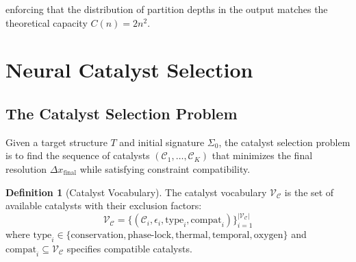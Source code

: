 \documentclass[11pt,a4paper]{article}
\theoremstyle{definition}
\newtheorem{definition}[theorem]{Definition}
\theoremstyle{remark}
\newcommand{\Sig}{\Sigma}
\newcommand{\catalyst}{\mathcal{C}}
\newcommand{\vocab}{\mathcal{V}}
\begin{document}
enforcing that the distribution of partition depths in the output matches the theoretical capacity $C(n) = 2n^2$.

\section{Neural Catalyst Selection}
\label{sec:catalyst}

\subsection{The Catalyst Selection Problem}

Given a target structure $T$ and initial signature $\Sig_0$, the catalyst selection problem is to find the sequence of catalysts $(\catalyst_1, \ldots, \catalyst_K)$ that minimizes the final resolution $\Delta x_{\mathrm{final}}$ while satisfying constraint compatibility.

\begin{definition}[Catalyst Vocabulary]
\label{def:catalyst_vocab}
The catalyst vocabulary $\vocab_\catalyst$ is the set of available catalysts with their exclusion factors:
\begin{equation}
\vocab_\catalyst = \{(\catalyst_i, \epsilon_i, \text{type}_i, \text{compat}_i)\}_{i=1}^{|\vocab_\catalyst|}
\end{equation}
where $\text{type}_i \in \{\text{conservation}, \text{phase-lock}, \text{thermal}, \text{temporal}, \text{oxygen}\}$ and $\text{compat}_i \subseteq \vocab_\catalyst$ specifies compatible catalysts.
\end{definition}
\end{document}
